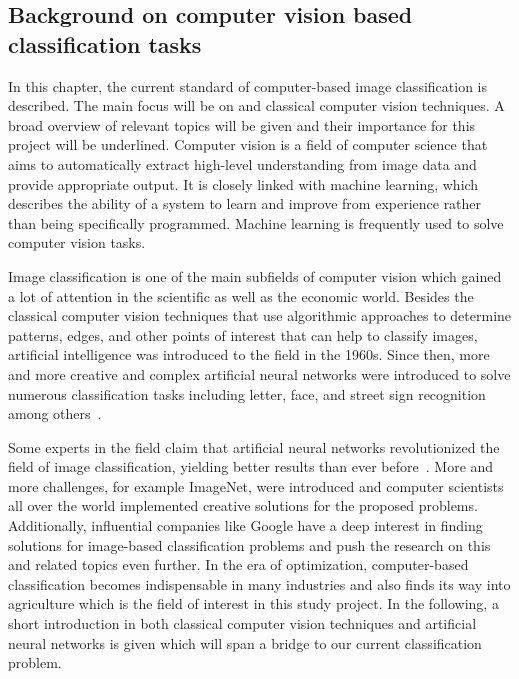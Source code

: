 \subsection{Background on computer vision based classification tasks}
\label{sec:BackgroundCV}

In this chapter, the current standard of computer-based image classification is described. The main focus will be on  and classical computer vision techniques. A broad overview of relevant topics will be given and their importance for this project will be underlined. Computer vision is a field of computer science that aims to automatically extract high-level understanding from image data and provide appropriate output. It is closely linked with machine learning, which describes the ability of a system to learn and improve from experience rather than being specifically programmed. Machine learning is frequently used to solve computer vision tasks.

\bigskip
Image classification is one of the main subfields of computer vision which gained a lot of attention in the scientific as well as the economic world. Besides the classical computer vision techniques that use algorithmic approaches to determine patterns, edges, and other points of interest that can help to classify images, artificial intelligence was introduced to the field in the 1960s. Since then, more and more creative and complex artificial neural networks were introduced to solve numerous classification tasks including letter, face, and street sign recognition among others~\citep{mironczuk2018recent,balaban2015deep,stallkamp2011german}.

Some experts in the field claim that artificial neural networks revolutionized the field of image classification, yielding better results than ever before~\citep{he2016deep,krizhevsky2012imagenet}. More and more challenges, for example ImageNet, were introduced and computer scientists all over the world implemented creative solutions for the proposed problems. Additionally, influential companies like Google have a deep interest in finding solutions for image-based classification problems and push the research on this and related topics even further. In the era of optimization, computer-based classification becomes indispensable in many industries and also finds its way into agriculture which is the field of interest in this study project.
In the following, a short introduction in both classical computer vision techniques and artificial neural networks is given which will span a bridge to our current classification problem.

